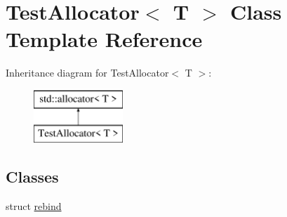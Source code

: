 \hypertarget{classTestAllocator}{}\section{Test\+Allocator$<$ T $>$ Class Template Reference}
\label{classTestAllocator}
Inheritance diagram for Test\+Allocator$<$ T $>$\+:\begin{figure}[H]
\begin{center}
\leavevmode
\includegraphics[height=2.000000cm]{classTestAllocator}
\end{center}
\end{figure}
\subsection*{Classes}
\begin{DoxyCompactItemize}
\item 
struct \hyperlink{structTestAllocator_1_1rebind}{rebind}
\end{DoxyCompactItemize}
